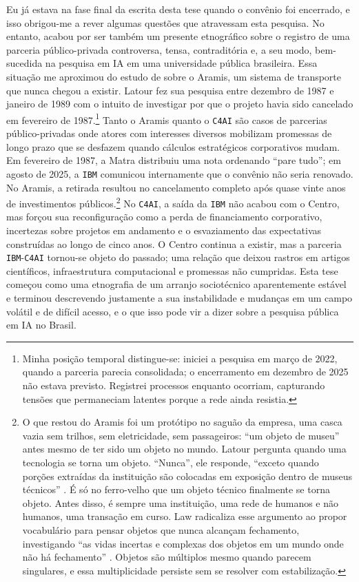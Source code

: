 Eu já estava na fase final da escrita desta tese quando o convênio foi encerrado, e isso obrigou-me a rever algumas questões que atravessam esta pesquisa. No entanto, acabou por ser também um presente etnográfico sobre o registro de uma parceria público-privada controversa, tensa, contraditória e, a seu modo, bem-sucedida na pesquisa em IA em uma universidade pública brasileira. Essa situação me aproximou do estudo de \textcite{Latour1993Aramis} sobre o Aramis, um sistema de transporte que nunca chegou a existir. Latour fez sua pesquisa entre dezembro de 1987 e janeiro de 1989 com o intuito de investigar por que o projeto havia sido cancelado em fevereiro de 1987.\footnote{Minha posição temporal distingue-se: iniciei a pesquisa em março de 2022, quando a parceria parecia consolidada; o encerramento em dezembro de 2025 não estava previsto. Registrei processos enquanto ocorriam, capturando tensões que permaneciam latentes porque a rede ainda resistia.} Tanto o Aramis quanto o \texttt{C4AI} são casos de parcerias público-privadas onde atores com interesses diversos mobilizam promessas de longo prazo que se desfazem quando cálculos estratégicos corporativos mudam. Em fevereiro de 1987, a Matra distribuiu uma nota ordenando ``pare tudo''; em agosto de 2025, a \texttt{IBM} comunicou internamente que o convênio não seria renovado. No Aramis, a retirada resultou no cancelamento completo após quase vinte anos de investimentos públicos.\footnote{O que restou do Aramis foi um protótipo no saguão da empresa, uma casca vazia sem trilhos, sem eletricidade, sem passageiros: ``um objeto de museu'' antes mesmo de ter sido um objeto no mundo. Latour pergunta quando uma tecnologia se torna um objeto. ``Nunca'', ele responde, ``exceto quando porções extraídas da instituição são colocadas em exposição dentro de museus técnicos'' \parencite[p. 9]{Latour1993Aramis}. É só no ferro-velho que um objeto técnico finalmente se torna objeto. Antes disso, é sempre uma instituição, uma rede de humanos e não humanos, uma transação em curso. Law radicaliza esse argumento ao propor vocabulário para pensar objetos que nunca alcançam fechamento, investigando ``as vidas incertas e complexas dos objetos em um mundo onde não há fechamento'' \parencite[p. 59]{Law2004After}. Objetos são múltiplos mesmo quando parecem singulares, e essa multiplicidade persiste sem se resolver com estabilização.}
No \texttt{C4AI}, a saída da \texttt{IBM} não acabou com o Centro, mas forçou sua reconfiguração como a perda de financiamento corporativo, incertezas sobre projetos em andamento e o esvaziamento das expectativas construídas ao longo de cinco anos. O Centro continua a existir, mas a parceria \texttt{IBM}-\texttt{C4AI} tornou-se objeto do passado; uma relação que deixou rastros em artigos científicos, infraestrutura computacional e promessas não cumpridas. Esta tese começou como uma etnografia de um arranjo sociotécnico aparentemente estável e terminou descrevendo justamente a sua instabilidade e mudanças em um campo volátil e de difícil acesso, e o que isso pode vir a dizer sobre a pesquisa pública em IA no Brasil.

